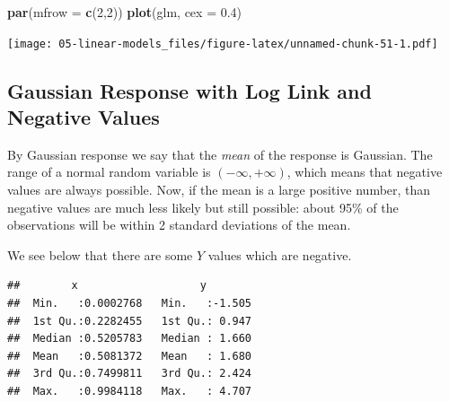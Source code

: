 \documentclass[
  openany]{book}
\newenvironment{Shaded}{\begin{snugshade}}{\end{snugshade}}
\newcommand{\ControlFlowTok}[1]{\textcolor[rgb]{0.13,0.29,0.53}{\textbf{#1}}}
\newcommand{\DataTypeTok}[1]{\textcolor[rgb]{0.13,0.29,0.53}{#1}}
\newcommand{\DecValTok}[1]{\textcolor[rgb]{0.00,0.00,0.81}{#1}}
\newcommand{\FloatTok}[1]{\textcolor[rgb]{0.00,0.00,0.81}{#1}}
\newcommand{\KeywordTok}[1]{\textcolor[rgb]{0.13,0.29,0.53}{\textbf{#1}}}
\newcommand{\NormalTok}[1]{#1}
\newcommand{\OperatorTok}[1]{\textcolor[rgb]{0.81,0.36,0.00}{\textbf{#1}}}
\newcommand{\StringTok}[1]{\textcolor[rgb]{0.31,0.60,0.02}{#1}}
\begin{document}
\begin{Shaded}
\begin{Highlighting}[]
\KeywordTok{par}\NormalTok{(}\DataTypeTok{mfrow =} \KeywordTok{c}\NormalTok{(}\DecValTok{2}\NormalTok{,}\DecValTok{2}\NormalTok{))}
\KeywordTok{plot}\NormalTok{(glm, }\DataTypeTok{cex =} \FloatTok{0.4}\NormalTok{)}
\end{Highlighting}
\end{Shaded}

\texttt{[image: 05-linear-models\_files/figure-latex/unnamed-chunk-51-1.pdf]}

\hypertarget{gaussian-response-with-log-link-and-negative-values}{%
\subsection{Gaussian Response with Log Link and Negative Values}\label{gaussian-response-with-log-link-and-negative-values}}

By Gaussian response we say that the \emph{mean} of the response is Gaussian. The range of a normal random variable is \((-\infty, +\infty)\), which means that negative values are always possible. Now, if the mean is a large positive number, than negative values are much less likely but still possible: about 95\% of the observations will be within 2 standard deviations of the mean.

We see below that there are some \(Y\) values which are negative.

\begin{Shaded}
\end{Shaded}

\begin{verbatim}
##        x                   y         
##  Min.   :0.0002768   Min.   :-1.505  
##  1st Qu.:0.2282455   1st Qu.: 0.947  
##  Median :0.5205783   Median : 1.660  
##  Mean   :0.5081372   Mean   : 1.680  
##  3rd Qu.:0.7499811   3rd Qu.: 2.424  
##  Max.   :0.9984118   Max.   : 4.707
\end{verbatim}
\end{document}
